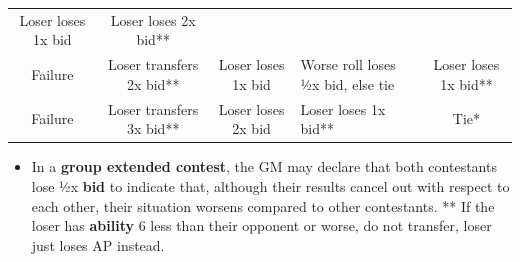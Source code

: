 \documentclass[
]{article}
\providecommand{\tightlist}{%
  \setlength{\itemsep}{0pt}\setlength{\parskip}{0pt}}
\begin{document}
\begin{longtable}[]{@{}ccclc@{}}
\begin{minipage}[t]{0.17\columnwidth}
Loser loses 1x bid\strut
\end{minipage} & \begin{minipage}[t]{0.18\columnwidth}\centering
Loser loses 2x bid**\strut
\end{minipage}\tabularnewline
\begin{minipage}[t]{0.18\columnwidth}\centering
Failure\strut
\end{minipage} & \begin{minipage}[t]{0.17\columnwidth}\centering
Loser transfers 2x bid**\strut
\end{minipage} & \begin{minipage}[t]{0.18\columnwidth}\centering
Loser loses 1x bid\strut
\end{minipage} & \begin{minipage}[t]{0.17\columnwidth}\raggedright
Worse roll loses ½x bid, else tie\strut
\end{minipage} & \begin{minipage}[t]{0.18\columnwidth}\centering
Loser loses 1x bid**\strut
\end{minipage}\tabularnewline
\begin{minipage}[t]{0.18\columnwidth}\centering
Failure\strut
\end{minipage} & \begin{minipage}[t]{0.17\columnwidth}\centering
Loser transfers 3x bid**\strut
\end{minipage} & \begin{minipage}[t]{0.18\columnwidth}\centering
Loser loses 2x bid\strut
\end{minipage} & \begin{minipage}[t]{0.17\columnwidth}\raggedright
Loser loses 1x bid**\strut
\end{minipage} & \begin{minipage}[t]{0.18\columnwidth}\centering
Tie*\strut
\end{minipage}\tabularnewline
\bottomrule
\end{longtable}

\begin{itemize}
\tightlist
\item
  In a \textbf{group extended contest}, the GM may declare that both
  contestants lose 1⁄2x \textbf{bid} to indicate that, although their
  results cancel out with respect to each other, their situation worsens
  compared to other contestants. ** If the loser has \textbf{ability} 6
  less than their opponent or worse, do not transfer, loser just loses
  AP instead.
\end{itemize}
\end{document}
